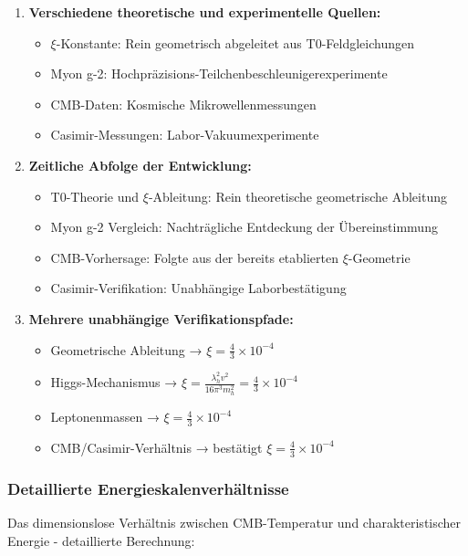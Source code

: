 \documentclass[12pt,a4paper]{article}
\theoremstyle{definition}
\theoremstyle{remark}
\begin{document}
	\begin{enumerate}
		\item \textbf{Verschiedene theoretische und experimentelle Quellen:}
		\begin{itemize}
			\item $\xi$-Konstante: Rein geometrisch abgeleitet aus T0-Feldgleichungen
			\item Myon g-2: Hochpr\"azisions-Teilchenbeschleunigerexperimente
			\item CMB-Daten: Kosmische Mikrowellenmessungen
			\item Casimir-Messungen: Labor-Vakuumexperimente
		\end{itemize}
		
		\item \textbf{Zeitliche Abfolge der Entwicklung:}
		\begin{itemize}
			\item T0-Theorie und $\xi$-Ableitung: Rein theoretische geometrische Ableitung
			\item Myon g-2 Vergleich: Nachtr\"agliche Entdeckung der \"Ubereinstimmung
			\item CMB-Vorhersage: Folgte aus der bereits etablierten $\xi$-Geometrie
			\item Casimir-Verifikation: Unabh\"angige Laborbest\"atigung
		\end{itemize}
		
		\item \textbf{Mehrere unabh\"angige Verifikationspfade:}
		\begin{itemize}
			\item Geometrische Ableitung → $\xi = \frac{4}{3} \times 10^{-4}$
			\item Higgs-Mechanismus → $\xi = \frac{\lambda_h^2 v^2}{16\pi^3 m_h^2} = \frac{4}{3} \times 10^{-4}$
			\item Leptonenmassen → $\xi = \frac{4}{3} \times 10^{-4}$
			\item CMB/Casimir-Verh\"altnis → best\"atigt $\xi = \frac{4}{3} \times 10^{-4}$
		\end{itemize}
	\end{enumerate}
	
	\subsubsection{Detaillierte Energieskalenverh\"altnisse}
	
	Das dimensionslose Verh\"altnis zwischen CMB-Temperatur und charakteristischer Energie - detaillierte Berechnung:
	
\end{document}

